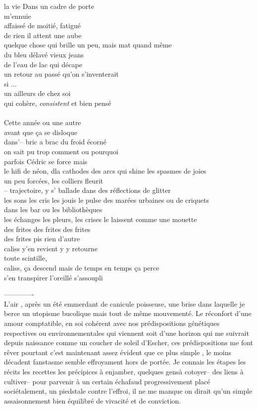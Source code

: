 \begin{paracol}{2}
la vie
Dans un cadre de porte\\
m'ennuie\\
affaissé de moitié, fatigué\\
de rien il attent une aube\\
quelque chose qui brille un peu, mais mat quand même\\
du bleu délavé vieux jeans\\
de l'eau de lac qui décape\\
un retour au passé qu'on s'inventerait\\
si ... \\
un ailleurs de chez soi \\
qui cohère, \textit{consistent} et bien pensé\\
\\
\switchcolumn
Cette année ou une autre\\
avant que ça se disloque\\
dans'--  bric a brac du froid écorné \\
on sait pu trop comment ou pourquoi\\
parfois Cédric se force mais\\
le hifi de néon, dla cathodes des arcs
qui shine les spasmes de joies\\
un peu forcées, les colliers fleurit\\
-- trajectoire, y s' ballade dans des réflections de glitter\\
les sons les cris les jouis le pulse
des marées urbaines ou de criquets\\
dans les bar ou les bibliothèques\\
les échanges les pleurs, les crises
le laissent comme une mouette\\
des frites des frites des frites\\
des frites pis rien d'autre\\
caliss y'en revient y y retourne \\
toute scintille, \\
caliss, ça descend mais 
de temps en temps ça perce\\
s'en transpirer l'oreillé s'assoupli\\

\end{paracol}
\clearpage
-------------\\
L'air , après un été emmerdant de canicule poisseuse,
une brise dans laquelle je berce un utopisme
bucolique mais tout de même mouvementé.
Le réconfort d'une amour comptatible,
en soi cohérent avec nos prédispositions
génétiques respectives ou environnementales qui viennent soit d'une horizon qui
me suivrait depuis naissance comme un coucher de soleil d'Escher, ces
prédispositions me font rêver pourtant c'est maintenant assez évident que ce
plus simple , le moins décadent fanstasme semble effroyament hors de portée. Je
connais les étapes les récits les recettes les précipices à enjamber, quelques
gensà cotoyer-- des liens à cultiver-- pour parvenir à un certain échafaud
progressivement placé sociétalement, un piedstale contre l'effroi, il ne me
manque on dirait qu'un simple assaisonnement bien équilibré de vivacité et de
conviction.
\clearpage
